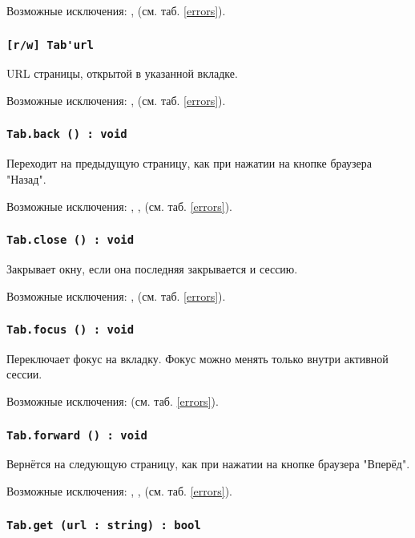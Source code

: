 Возможные исключения: ,  (см. таб. \ref{errors}).

\subsubsection{\lstinline|[r/w] Tab'url|}

URL страницы, открытой в указанной вкладке.

Возможные исключения: ,  (см. таб. \ref{errors}).

\subsubsection{\lstinline|Tab.back () : void|}

Переходит на предыдущую страницу, как при нажатии на кнопке браузера "Назад".

Возможные исключения: , ,  (см. таб. \ref{errors}).

\subsubsection{\lstinline|Tab.close () : void|}

Закрывает окну, если она последняя закрывается и сессию.

Возможные исключения: ,  (см. таб. \ref{errors}).

\subsubsection{\lstinline|Tab.focus () : void|}

Переключает фокус на вкладку. Фокус можно менять только внутри активной сессии.

Возможные исключения:  (см. таб. \ref{errors}).

\subsubsection{\lstinline|Tab.forward () : void|}

Вернётся на следующую страницу, как при нажатии на кнопке браузера "Вперёд".

Возможные исключения: , ,  (см. таб. \ref{errors}).

\subsubsection{\lstinline|Tab.get (url : string) : bool|}

